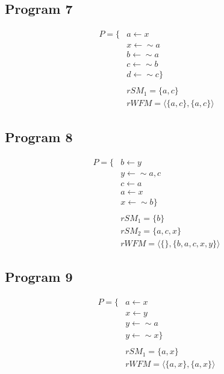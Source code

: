 \subsection{Program 7}
\begin{align*}
P=\{
& a\leftarrow x\\
& x\leftarrow \sim a\\
& b\leftarrow \sim a\\
& c\leftarrow \sim b\\
& d\leftarrow \sim c
\}\\
\\
& rSM_{1}=\{a,c\}\\
& rWFM=\langle\{a,c\},\{a,c\}\rangle\end{align*}

\subsection{Program 8}
\begin{align*}
P=\{
& b\leftarrow y\\
& y\leftarrow \sim a, c\\
& c\leftarrow a\\
& a\leftarrow x\\
& x\leftarrow \sim b
\}\\
\\
& rSM_{1}=\{b\}\\
& rSM_{2}=\{a,c,x\}\\
& rWFM=\langle\{\},\{b,a,c,x,y\}\rangle\end{align*}

\subsection{Program 9}
\begin{align*}
P=\{
& a\leftarrow x\\
& x\leftarrow y\\
& y\leftarrow \sim a\\
& y\leftarrow \sim x
\}\\
\\
& rSM_{1}=\{a,x\}\\
& rWFM=\langle\{a,x\},\{a,x\}\rangle\end{align*}

